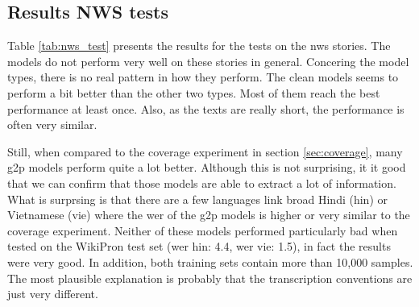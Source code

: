 


\subsection{Results NWS tests}
Table \ref{tab:nws_test} presents the results for the tests on the \ac{nws} stories. The models do not perform very well on these stories in general. Concering the model types, there is no real pattern in how they perform. The clean models seems to perform a bit better than the other two types. Most of them reach the best performance at least once. Also, as the texts are really short, the performance is often very similar.

Still, when compared to the coverage experiment in section \ref{sec:coverage}, many \ac{g2p} models perform quite a lot better. Although this is not surprising, it it good that we can confirm that those models are able to extract a lot of information. What is surprsing is that there are a few languages link broad Hindi (hin) or Vietnamese (vie) where the \ac{wer} of the \ac{g2p} models is higher or very similar to the coverage experiment. Neither of these models performed particularly bad when tested on the WikiPron test set (\ac{wer} hin: 4.4, \ac{wer} vie: 1.5), in fact the results were very good. In addition, both training sets contain more than 10,000 samples. The most plausible explanation is probably that the transcription conventions are just very different. 

